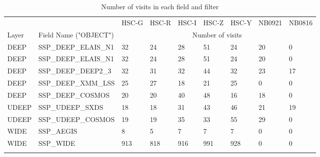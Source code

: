 \begin{longtable}{lllllllll}
& & HSC-G & HSC-R & HSC-I & HSC-Z & HSC-Y & NB0921 & NB0816  \\
Layer & Field Name ("OBJECT") & \multicolumn{7}{c}{Number of visits} \\
DEEP & SSP{\_}DEEP{\_}ELAIS{\_}N1 & 32&24&28&51&24&20&0 \\
DEEP & SSP{\_}DEEP{\_}ELAIS{\_}N1 &32&24&28&51&24&20&0 \\
DEEP & SSP{\_}DEEP{\_}DEEP2{\_}3 &32&31&32&44&32&23&17 \\
DEEP & SSP{\_}DEEP{\_}XMM{\_}LSS &25&27&18&21&25&0&0 \\
DEEP & SSP{\_}DEEP{\_}COSMOS &20&20&40&48&16&18&0 \\
UDEEP&SSP{\_}UDEEP{\_}SXDS&18&18&31&43&46&21&19 \\
UDEEP & SSP{\_}UDEEP{\_}COSMOS&19&19&35&33&55&29&0 \\
WIDE&SSP{\_}AEGIS&8&5&7&7&7&0&0 \\
WIDE & SSP{\_}WIDE&913&818&916&991&928&0&0 \\
\caption{Number of visits in each field and filter}
\label{tab:dataset}
\end{longtable}
